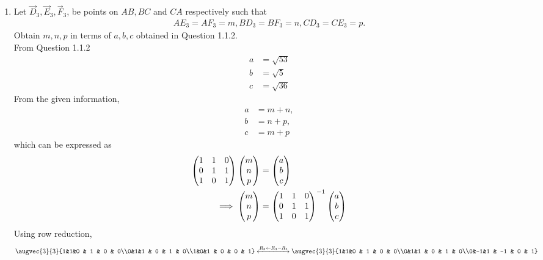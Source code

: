 \documentclass[11pt]{book}
\begin{document}
\begin{enumerate}[label=\thesection.\arabic*.,ref=\thesection.\theenumi]


\item Let $\vec{D}_3, \vec{E}_3, \vec{F}_3$, be points on $AB, BC$ and $CA$ respectively such that
\begin{align}
AE_3 = AF_3=m, BD_3 = BF_3=n, CD_3 = CE_3=p.
\end{align}
Obtain $m,n,p$ in terms of $a,b,c$ obtained in Question 1.1.2. \\ 
\solution 
From Question 1.1.2
\begin{align}
    a&=\sqrt{53} \\ b&=\sqrt{5} \\ c&=\sqrt{36}
\end{align}
From the given information, 
\begin{align}
% 
    a &= m+n,\\
    b &= n+p, \\
    c &= m+p 
\end{align}
which can be expressed as
\begin{align}
\begin{pmatrix}1&1&0\\0&1&1\\1&0&1\\\end{pmatrix}\begin{pmatrix}m\\n\\p\end{pmatrix} &= \begin{pmatrix}a\\b\\c\end{pmatrix}
\\
\implies 
	\begin{pmatrix}m\\n\\p\end{pmatrix} &= \begin{pmatrix}1&1&0\\0&1&1\\1&0&1\\\end{pmatrix}^{-1}\begin{pmatrix}a\\b\\c\end{pmatrix}
\end{align}
Using row reduction,
\begin{align}
			\augvec{3}{3}{1&1&0 & 1 & 0 & 0\\0&1&1 & 0 & 1 & 0\\1&0&1 & 0 & 0 & 1}
			\xleftrightarrow[]{R_3 \leftarrow R_3 - R_1}
			\augvec{3}{3}{1&1&0 & 1 & 0 & 0\\0&1&1 & 0 & 1 & 0\\0&-1&1 & -1 & 0 & 1} \\

\end{align}
\end{enumerate}
\end{document}
